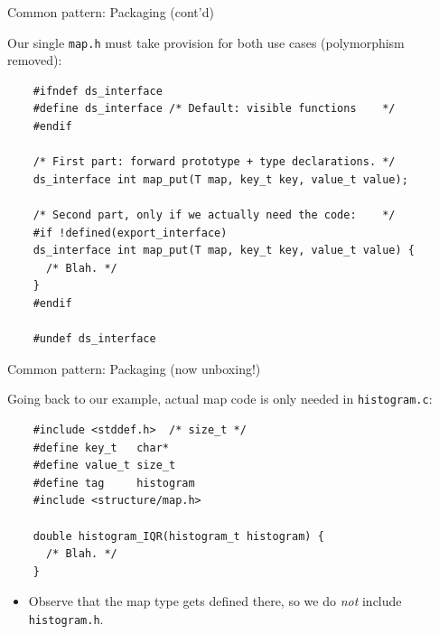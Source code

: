 \begin{frame}[fragile]{Common pattern: Packaging (cont'd)}

  Our single \lstinline{map.h} must take provision for both use cases (polymorphism removed):

  \begin{lstlisting}
    #ifndef ds_interface
    #define ds_interface /* Default: visible functions    */
    #endif
    
    /* First part: forward prototype + type declarations. */
    ds_interface int map_put(T map, key_t key, value_t value);

    /* Second part, only if we actually need the code:    */
    #if !defined(export_interface)
    ds_interface int map_put(T map, key_t key, value_t value) {
      /* Blah. */
    }
    #endif

    #undef ds_interface
  \end{lstlisting}
  
\end{frame}

\begin{frame}[fragile]{Common pattern: Packaging (now unboxing!)}

  Going back to our example, actual map code is only needed in \lstinline{histogram.c}:
  \begin{lstlisting}
    #include <stddef.h>  /* size_t */
    #define key_t   char*
    #define value_t size_t
    #define tag     histogram
    #include <structure/map.h>

    double histogram_IQR(histogram_t histogram) {
      /* Blah. */
    }
  \end{lstlisting}

  \begin{itemize}
  \item Observe that the map type gets defined there, so we do {\em not} include \lstinline{histogram.h}.
  \end{itemize}

\end{frame}

